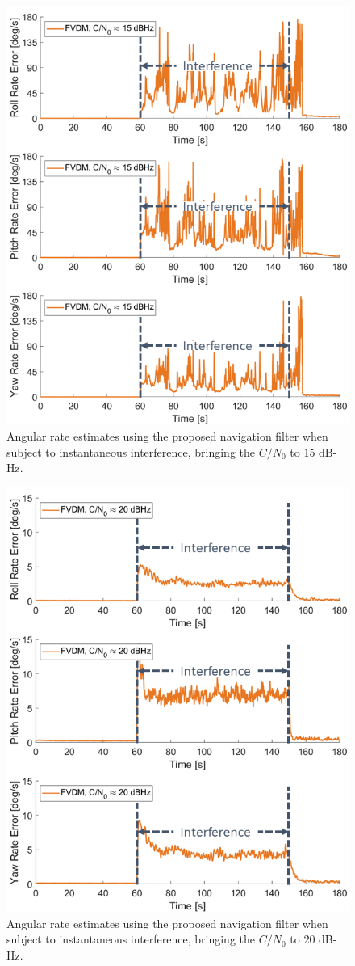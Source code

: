 \begin{figure}[!ht]
    \centering
    \includegraphics[width=0.75\linewidth]{Figures/Results/trajectoryfigure/Slide8.PNG}
    \caption{Angular rate estimates using the proposed navigation filter when subject to instantaneous interference, bringing the \(C/N_0\) to \(15\) dB-Hz.}\label{fig:Ang15}
\end{figure}

\begin{figure}[!ht]
    \centering
    \includegraphics[width=0.75\linewidth]{Figures/Results/trajectoryfigure/Slide9.PNG}
    \caption{Angular rate estimates using the proposed navigation filter when subject to instantaneous interference, bringing the \(C/N_0\) to \(20\) dB-Hz.}\label{fig:Ang20}
\end{figure}

